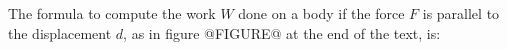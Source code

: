 The formula to compute the work $W$ done on a body if 
the force $F$ is parallel to the displacement $d$,
as in figure @FIGURE@ at the end of the text, is: